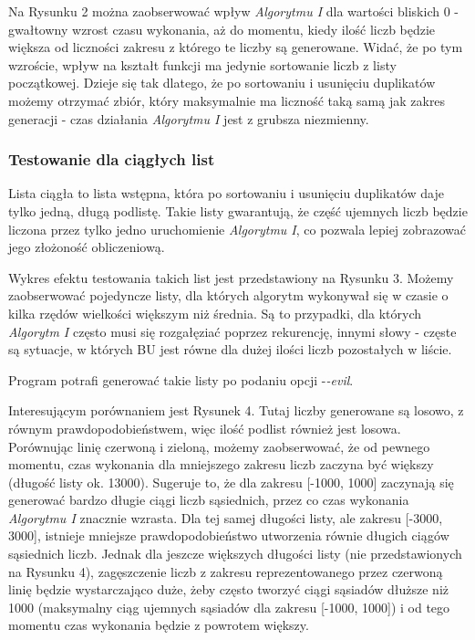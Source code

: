\documentclass[11pt]{article} %
\begin{document}
Na Rysunku 2 można zaobserwować wpływ \textsl{Algorytmu I} dla wartości bliskich 0 - gwałtowny wzrost czasu wykonania, aż do momentu, kiedy ilość liczb będzie większa od liczności zakresu z którego te liczby są generowane. Widać, że po tym wzroście, wpływ na kształt funkcji ma jedynie sortowanie liczb z listy początkowej. Dzieje się tak dlatego, że po sortowaniu i usunięciu duplikatów możemy otrzymać zbiór, który maksymalnie ma liczność taką samą jak zakres generacji - czas działania \textsl{Algorytmu I} jest z grubsza niezmienny.

\subsubsection{Testowanie dla ciągłych list}
Lista ciągła to lista wstępna, która po sortowaniu i usunięciu duplikatów daje tylko jedną, długą podlistę. Takie listy gwarantują, że część ujemnych liczb będzie liczona przez tylko jedno uruchomienie \textsl{Algorytmu I}, co pozwala lepiej zobrazować jego złożoność obliczeniową.

Wykres efektu testowania takich list jest przedstawiony na Rysunku 3. Możemy zaobserwować pojedyncze listy, dla których algorytm wykonywał się w czasie o kilka rzędów wielkości większym niż średnia. Są to przypadki, dla których \textsl{Algorytm I} często musi się rozgałęziać poprzez rekurencję, innymi słowy - częste są sytuacje, w których BU jest równe dla dużej ilości liczb pozostałych w liście.

Program potrafi generować takie listy po podaniu opcji -\textsl{-evil}.

Interesującym porównaniem jest Rysunek 4. Tutaj liczby generowane są losowo, z równym prawdopodobieństwem, więc ilość podlist również jest losowa. Porównując linię czerwoną i zieloną, możemy zaobserwować, że od pewnego momentu, czas wykonania dla mniejszego zakresu liczb zaczyna być większy (długość listy ok. 13000). Sugeruje to, że dla zakresu [-1000, 1000] zaczynają się generować bardzo długie ciągi liczb sąsiednich, przez co czas wykonania \textsl{Algorytmu I} znacznie wzrasta. Dla tej samej długości listy, ale zakresu [-3000, 3000], istnieje mniejsze prawdopodobieństwo utworzenia równie długich ciągów sąsiednich liczb. Jednak dla jeszcze większych długości listy (nie przedstawionych na Rysunku 4), zagęszczenie liczb z zakresu reprezentowanego przez czerwoną linię będzie wystarczająco duże, żeby często tworzyć ciągi sąsiadów dłuższe niż 1000 (maksymalny ciąg ujemnych sąsiadów dla zakresu [-1000, 1000]) i od tego momentu czas wykonania będzie z powrotem większy.
\end{document}
